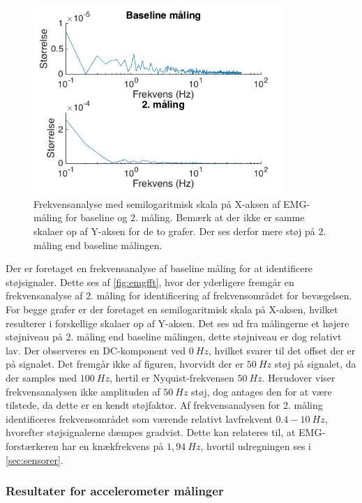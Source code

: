 \begin{figure}[H]
	\centering
	\includegraphics[width=0.85\textwidth]{figures/Pilotforsoeg/emgfft.png}
	\caption{Frekvensanalyse med semilogaritmisk skala på X-aksen af EMG-måling for baseline og 2. måling. Bemærk at der ikke er samme skalaer op af Y-aksen for de to grafer. Der ses derfor mere støj på 2. måling end baseline målingen.}
	\label{fig:emgfft}
\end{figure}

Der er foretaget en frekvensanalyse af baseline måling for at identificere støjsignaler. Dette ses af \autoref{fig:emgfft}, hvor der yderligere fremgår en frekvensanalyse af 2. måling for identificering af frekvensområdet for bevægelsen. For begge grafer er der foretaget en semilogaritmisk skala på X-aksen, hvilket resulterer i forskellige skalaer op af Y-aksen. Det ses ud fra målingerne et højere støjniveau på 2. måling end baseline målingen, dette støjniveau er dog relativt lav. 
Der observeres en DC-komponent ved $0~Hz$, hvilket svarer til det offset der er på signalet. 
Det fremgår ikke af figuren, hvorvidt der er $50~Hz$ støj på signalet, da der samples med $100~Hz$, hertil er Nyquist-frekvensen $50~Hz$. Herudover viser frekvensanalysen ikke amplituden af $50~Hz$ støj, dog antages den for at være tilstede, da dette er en kendt støjfaktor. 
Af frekvensanalysen for 2. måling identificeres frekvensområdet som værende relativt lavfrekvent $0.4-10~Hz$, hvorefter støjsignalerne dæmpes gradvist. Dette kan relateres til, at EMG-forstærkeren har en knækfrekvens på $1,94~Hz$, hvortil udregningen ses i \autoref{sec:sensorer}. 


\subsubsection{Resultater for accelerometer målinger} \label{sec:acc_fft}

